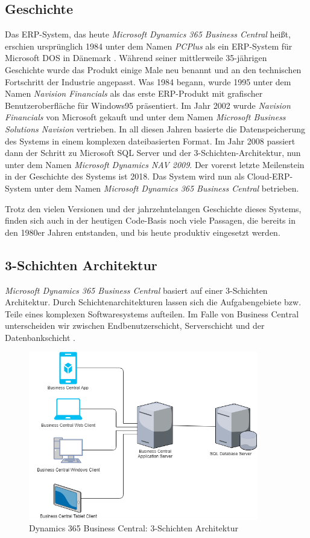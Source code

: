 \subsection{Geschichte}
\label{subsec:Geschichte}
Das ERP-System, das heute \textit{Microsoft Dynamics 365 Business Central} heißt, erschien ursprünglich 1984 unter dem Namen \textit{PCPlus} als ein ERP-System für Microsoft DOS in Dänemark \cite{DesignAndImplementationGayer}. Während seiner mittlerweile 35-jährigen Geschichte wurde das Produkt einige Male neu benannt und an den technischen Fortschritt der Industrie angepasst. Was 1984 begann, wurde 1995 unter dem Namen \textit{Navision Financials} als das erste ERP-Produkt mit grafischer Benutzeroberfläche für Windows95 präsentiert. Im Jahr 2002 wurde \textit{Navision Financials} von Microsoft gekauft und unter dem Namen \textit{Microsoft Business Solutions Navision} vertrieben. In all diesen Jahren basierte die Datenspeicherung des Systems in einem komplexen dateibasierten Format. Im Jahr 2008 passiert dann der Schritt zu Microsoft SQL Server und der 3-Schichten-Architektur, nun unter dem Namen \textit{Microsoft Dynamics NAV 2009}. Der vorerst letzte Meilenstein in der Geschichte des Systems ist 2018. Das System wird nun als Cloud-ERP-System unter dem Namen \textit{Microsoft Dynamics 365 Business Central} betrieben.

Trotz den vielen Versionen und der jahrzehntelangen Geschichte dieses Systems, finden sich auch in der heutigen Code-Basis noch viele Passagen, die bereits in den 1980er Jahren entstanden, und bis heute produktiv eingesetzt werden.

\subsection{3-Schichten Architektur}
\label{subsec:3-Schichten Architektur}
\textit{Microsoft Dynamics 365 Business Central} basiert auf einer 3-Schichten Architektur. Durch Schichtenarchitekturen lassen sich die Aufgabengebiete bzw. Teile eines komplexen Softwaresystems aufteilen. Im Falle von Business Central unterscheiden wir zwischen Endbenutzerschicht, Serverschicht und der Datenbankschicht \cite{msdnProductArchitecture}\cite{DesignAndImplementationGayer}.

\begin{figure}[h]
	\centering
	\includegraphics[width=100mm]{images/3TierArchitecture.png}
	\caption{Dynamics 365 Business Central: 3-Schichten Architektur}
	\label{fig:Image3TierArchitecture}
\end{figure}

